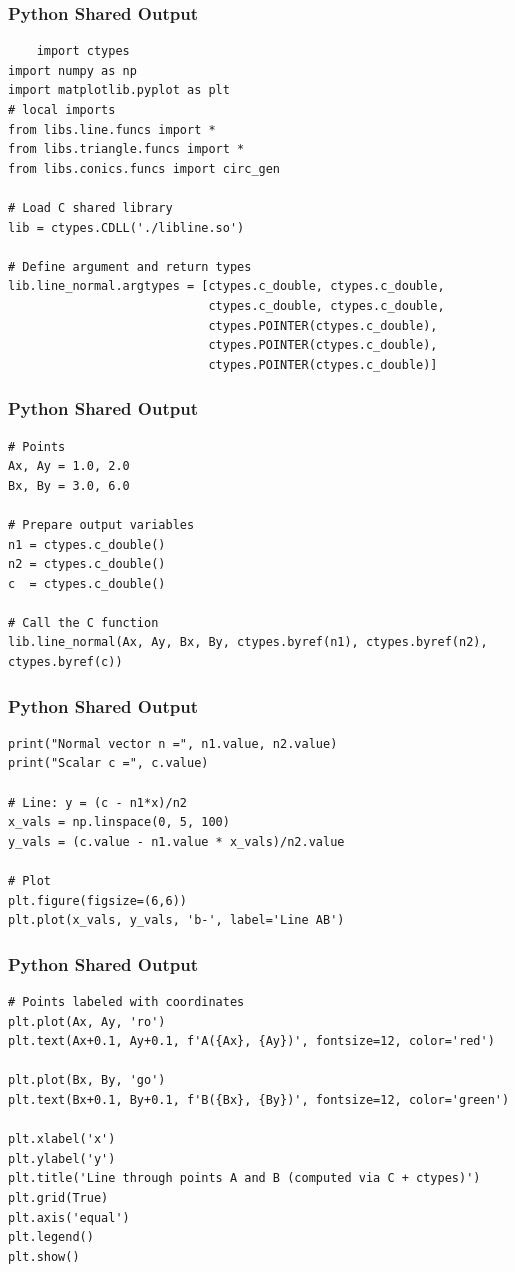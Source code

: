 \documentclass{beamer}
\begin{document}
\begin{frame}[fragile]
    \frametitle{Python Shared Output}
    \begin{lstlisting}
    import ctypes
import numpy as np
import matplotlib.pyplot as plt
# local imports
from libs.line.funcs import *
from libs.triangle.funcs import *
from libs.conics.funcs import circ_gen

# Load C shared library
lib = ctypes.CDLL('./libline.so')

# Define argument and return types
lib.line_normal.argtypes = [ctypes.c_double, ctypes.c_double,
                            ctypes.c_double, ctypes.c_double,
                            ctypes.POINTER(ctypes.c_double),
                            ctypes.POINTER(ctypes.c_double),
                            ctypes.POINTER(ctypes.c_double)]
\end{lstlisting}
\end{frame}
\begin{frame}[fragile]
    \frametitle{Python Shared Output}
    \begin{lstlisting}
# Points
Ax, Ay = 1.0, 2.0
Bx, By = 3.0, 6.0

# Prepare output variables
n1 = ctypes.c_double()
n2 = ctypes.c_double()
c  = ctypes.c_double()

# Call the C function
lib.line_normal(Ax, Ay, Bx, By, ctypes.byref(n1), ctypes.byref(n2), ctypes.byref(c))
\end{lstlisting}
\end{frame}
\begin{frame}[fragile]
    \frametitle{Python Shared Output}
    \begin{lstlisting}
print("Normal vector n =", n1.value, n2.value)
print("Scalar c =", c.value)

# Line: y = (c - n1*x)/n2
x_vals = np.linspace(0, 5, 100)
y_vals = (c.value - n1.value * x_vals)/n2.value

# Plot
plt.figure(figsize=(6,6))
plt.plot(x_vals, y_vals, 'b-', label='Line AB')
\end{lstlisting}
\end{frame}
\begin{frame}[fragile]
    \frametitle{Python Shared Output}
    \begin{lstlisting}
# Points labeled with coordinates
plt.plot(Ax, Ay, 'ro')
plt.text(Ax+0.1, Ay+0.1, f'A({Ax}, {Ay})', fontsize=12, color='red')

plt.plot(Bx, By, 'go')
plt.text(Bx+0.1, By+0.1, f'B({Bx}, {By})', fontsize=12, color='green')

plt.xlabel('x')
plt.ylabel('y')
plt.title('Line through points A and B (computed via C + ctypes)')
plt.grid(True)
plt.axis('equal')
plt.legend()
plt.show()
 \end{lstlisting}
\end{frame}  
\end{document}
